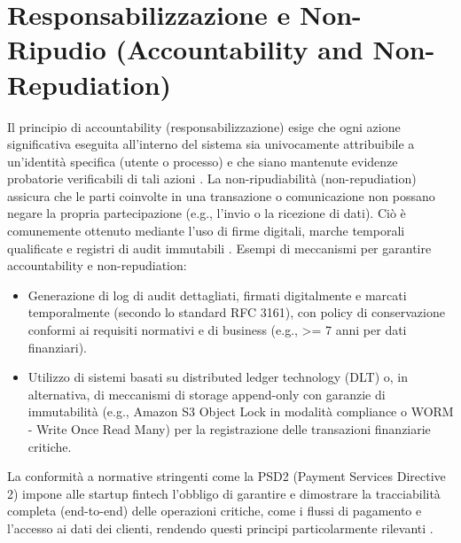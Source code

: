 \section{Responsabilizzazione e Non-Ripudio (Accountability and Non-Repudiation)}
Il principio di accountability (responsabilizzazione) esige che ogni azione significativa eseguita all'interno del sistema sia univocamente attribuibile a un'identità specifica (utente o processo) e che siano mantenute evidenze probatorie verificabili di tali azioni \cite{Feigenbaum_2020_Accountability}. La non-ripudiabilità (non-repudiation) assicura che le parti coinvolte in una transazione o comunicazione non possano negare la propria partecipazione (e.g., l'invio o la ricezione di dati). Ciò è comunemente ottenuto mediante l'uso di firme digitali, marche temporali qualificate e registri di audit immutabili \cite{NIST_Glossary_NonRepudiation}.
Esempi di meccanismi per garantire accountability e non-repudiation:
\begin{itemize}
\item Generazione di log di audit dettagliati, firmati digitalmente e marcati temporalmente (secondo lo standard RFC 3161), con policy di conservazione conformi ai requisiti normativi e di business (e.g., >= 7 anni per dati finanziari).
\item Utilizzo di sistemi basati su distributed ledger technology (DLT) o, in alternativa, di meccanismi di storage append-only con garanzie di immutabilità (e.g., Amazon S3 Object Lock in modalità compliance o WORM - Write Once Read Many) per la registrazione delle transazioni finanziarie critiche.
\end{itemize}
La conformità a normative stringenti come la PSD2 (Payment Services Directive 2) impone alle startup fintech l'obbligo di garantire e dimostrare la tracciabilità completa (end-to-end) delle operazioni critiche, come i flussi di pagamento e l'accesso ai dati dei clienti, rendendo questi principi particolarmente rilevanti \cite{NIST_SP_800_160v2_2019}.
